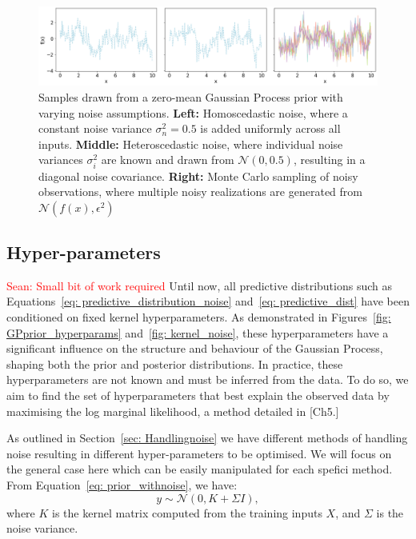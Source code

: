\documentclass[10pt]{article}
\newcommand{\Sean}[1]{{\textcolor{red}{{Sean: #1}} }}
\begin{document}
\begin{figure}[H]
    \centering
    \includegraphics[width=\textwidth]{LatexPlots/1dplots/GPR_noise_comparison.png}
    \caption{Samples drawn from a zero-mean Gaussian Process prior with varying noise assumptions.
    \textbf{Left:} Homoscedastic noise, where a constant noise variance \(\sigma_n^2 = 0.5\) is added uniformly across all inputs.
    \textbf{Middle:} Heteroscedastic noise, where individual noise variances \(\sigma_i^2\) are known and drawn from \(\mathcal{N}(0, 0.5)\), resulting in a diagonal noise covariance.
    \textbf{Right:} Monte Carlo sampling of noisy observations, where multiple noisy realizations are generated from \(\mathcal{N}(f(x), \epsilon^2)\)}
    \label{fig:noise_comparison}
\end{figure}




\subsection{Hyper-parameters}
\label{sec: Hyper_parameters}
\Sean{Small bit of work required}
Until now, all predictive distributions such as Equations~\ref{eq: predictive_distribution_noise} and~\ref{eq: predictive_dist} have been conditioned on fixed kernel hyperparameters. As demonstrated in Figures~\ref{fig: GPprior_hyperparams} and~\ref{fig: kernel_noise}, these hyperparameters have a significant influence on the structure and behaviour of the Gaussian Process, shaping both the prior and posterior distributions. 
In practice, these hyperparameters are not known and must be inferred from the data. To do so, we aim to find the set of hyperparameters that best explain the observed data by maximising the log marginal likelihood, a method detailed in [Ch5\cite{bible}.]

\noindent
As outlined in Section~\ref{sec: Handlingnoise} we have different methods of handling noise resulting in different hyper-parameters to be optimised. We will focus on the general case here which can be easily manipulated for each spefici method.
From Equation~\ref{eq: prior_withnoise}, we have:
\[
y \sim \mathcal{N}(0, K + \Sigma I),
\]
where \( K \) is the kernel matrix computed from the training inputs \( X \), and \( \Sigma\) is the noise variance.
\end{document}
